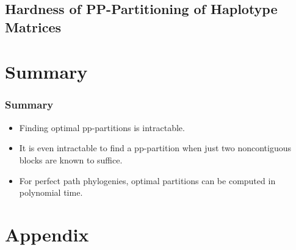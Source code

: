 \documentclass{beamer}
\begin{document}
\subsection{Hardness of PP-Partitioning of Haplotype Matrices}

\section*{Summary}

\begin{frame}
  \frametitle<presentation>{Summary}
  \begin{itemize}
  \item
    Finding optimal pp-partitions is \alert{intractable}. 
  \item
    It is even intractable to find a pp-partition when \alert{just two 
      noncontiguous  blocks are known to suffice}.
  \item
    For perfect \alert{path} phylogenies, optimal partitions can be
    computed \alert{in polynomial time}.
  \end{itemize}
\end{frame}


\appendix
\section*{Appendix}
\end{document}
